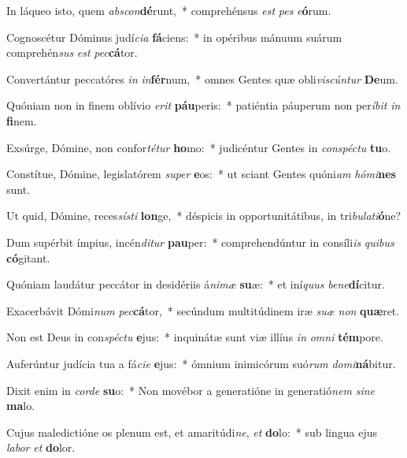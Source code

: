 \item In láqueo isto, quem \textit{abs}\textit{con}\textbf{dé}runt,~* comprehénsus \textit{est} \textit{pes} \textit{e}\textbf{ó}rum.
\item Cognoscétur Dóminus judí\textit{ci}\textit{a} \textbf{fá}ciens:~* in opéribus mánuum suárum comprehén\textit{sus} \textit{est} \textit{pec}\textbf{cá}tor.
\item Convertántur peccatóres \textit{in} \textit{in}\textbf{fér}num,~* omnes Gentes quæ obli\textit{vis}\textit{cún}\textit{tur} \textbf{De}um.
\item Quóniam non in finem oblívio \textit{e}\textit{rit} \textbf{páu}peris:~* patiéntia páuperum non per\textit{í}\textit{bit} \textit{in} \textbf{fi}nem.
\item Exsúrge, Dómine, non confor\textit{té}\textit{tur} \textbf{ho}mo:~* judicéntur Gentes in \textit{con}\textit{spéc}\textit{tu} \textbf{tu}o.
\item Constítue, Dómine, legislatórem \textit{su}\textit{per} \textbf{e}os:~* ut sciant Gentes quóni\textit{am} \textit{hó}\textit{mi}\textbf{nes} sunt.
\item Ut quid, Dómine, reces\textit{sís}\textit{ti} \textbf{lon}ge,~* déspicis in opportunitátibus, in tri\textit{bu}\textit{la}\textit{ti}\textbf{ó}ne?
\item Dum supérbit ímpius, incén\textit{di}\textit{tur} \textbf{pau}per:~* comprehendúntur in consíli\textit{is} \textit{qui}\textit{bus} \textbf{có}gitant.
\item Quóniam laudátur peccátor in desidériis á\textit{ni}\textit{mæ} \textbf{su}æ:~* et iní\textit{quus} \textit{be}\textit{ne}\textbf{dí}citur.
\item Exacerbávit Dómi\textit{num} \textit{pec}\textbf{cá}tor,~* secúndum multitúdinem iræ \textit{su}\textit{æ} \textit{non} \textbf{quæ}ret.
\item Non est Deus in con\textit{spéc}\textit{tu} \textbf{e}jus:~* inquinátæ sunt viæ illíus \textit{in} \textit{om}\textit{ni} \textbf{tém}pore.
\item Auferúntur judícia tua a fá\textit{ci}\textit{e} \textbf{e}jus:~* ómnium inimicórum suó\textit{rum} \textit{do}\textit{mi}\textbf{ná}bitur.
\item Dixit enim in \textit{cor}\textit{de} \textbf{su}o:~* Non movébor a generatióne in generatió\textit{nem} \textit{si}\textit{ne} \textbf{ma}lo.
\item Cujus maledictióne os plenum est, et amaritúdi\textit{ne}, \textit{et} \textbf{do}lo:~* sub lingua ejus \textit{la}\textit{bor} \textit{et} \textbf{do}lor.
